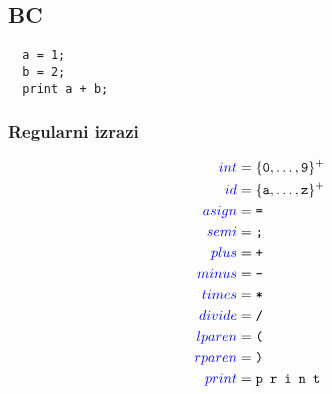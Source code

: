 \documentclass{article}
\newcommand{\Symbol}[1]{\textcolor{blue}{#1}}
\newcommand{\Char}[1]{\texttt{#1}}
\newcommand{\Seq}{{\ \,}}
\newcommand{\KleenePlus}[1]{#1^+}
\begin{document}
\subsection{BC}
\begin{verbatim}
  a = 1;
  b = 2;
  print a + b;
\end{verbatim}

\subsubsection*{Regularni izrazi}
\begin{equation*}
  \begin{aligned}
    \Symbol{int} &= \KleenePlus{\{\Char{0}, \dots, \Char{9}\}}\\
    \Symbol{id} &= \KleenePlus{\{\Char{a}, \dots, \Char{z}\}}\\
    \Symbol{asign} &= \Char{=}\\
    \Symbol{semi} &= \Char{;}\\
    \Symbol{plus} &= \Char{+}\\
    \Symbol{minus} &= \Char{-}\\
    \Symbol{times} &= \Char{*}\\
    \Symbol{divide} &= \Char{/}\\
    \Symbol{lparen} &= \Char{(}\\
    \Symbol{rparen} &= \Char{)}\\
    \Symbol{print} &= \Char{p} \Seq \Char{r} \Seq \Char{i} \Seq \Char{n} \Seq \Char{t}\\
  \end{aligned}
\end{equation*}
\end{document}
